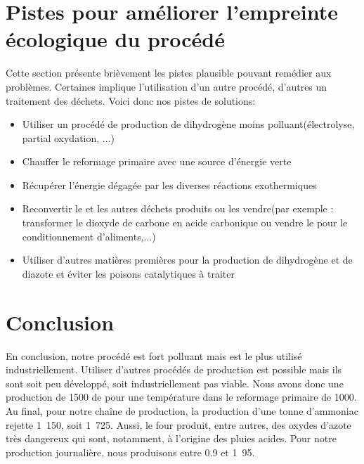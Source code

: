 \section{Pistes pour améliorer l'empreinte écologique du procédé}
Cette section présente brièvement les pistes plausible pouvant remédier aux problèmes. Certaines implique l'utilisation d'un autre procédé, d'autres un traitement des déchets. Voici donc nos pistes de solutions:
\begin{itemize}
	\item Utiliser un procédé de production de dihydrogène moins polluant(électrolyse, partial oxydation, ...)
	\item Chauffer le reformage primaire avec une source d'énergie verte
	\item Récupérer l'énergie dégagée par les diverses réactions exothermiques
	\item Reconvertir le  et les autres déchets produits ou les vendre(par exemple : transformer le dioxyde de carbone en acide carbonique ou vendre le  pour le conditionnement d'aliments,...)
	\item Utiliser d'autres matières premières pour la production de dihydrogène et de diazote et éviter les poisons catalytiques à traiter
\end{itemize}
\section{Conclusion}
En conclusion, notre procédé est fort polluant mais est le plus utilisé industriellement. Utiliser d'autres procédés de production est possible mais ils sont soit peu développé, soit industriellement pas viable. Nous avons donc une production de \unit{1500}{\ton\per\dday} de  pour une température dans le reformage primaire de \unit{1000}{\kelvin}. Au final, pour notre chaîne de production, la production d'une tonne d'ammoniac rejette \unit{1.150}{\ton}, soit \unit{1.725}{\ton\per\dday}. Aussi, le four produit, entre autres, des oxydes d'azote très dangereux qui sont, notamment, à l'origine des pluies acides. Pour notre production journalière, nous produisons entre 0.9 et \unit{1.95}{\ton\per\dday}.

